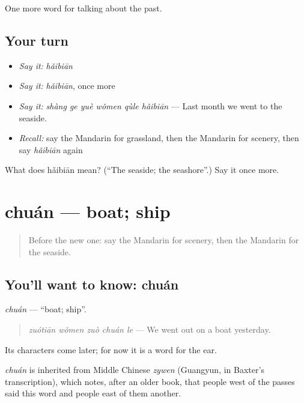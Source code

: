 \begin{grammarlens}[title={What you've built}]
One more word for talking about the past.
\end{grammarlens}

\subsection*{Your turn}
\begin{itemize}
\raggedright
  \item \emph{Say it:} \emph{hǎibiān}
  \item \emph{Say it:} \emph{hǎibiān}, once more
  \item \emph{Say it:} \emph{shàng ge yuè wǒmen qùle hǎibiān} — Last month we went to the seaside.
  \item \emph{Recall:} say the Mandarin for grassland, then the Mandarin for scenery, then say \emph{hǎibiān} again
\end{itemize}

\begin{tcolorbox}[breakable,colback=teal!4,colframe=teal!35!black,title={Before you move on}]
What does hǎibiān mean? (\textquotedblleft{}The seaside; the seashore\textquotedblright{}.) Say it once more.
\end{tcolorbox}
\section[chuán]{chuán — boat; ship}

\label{lesson:ZH-C227-chuan}



\begin{quote}
Before the new one: say the Mandarin for scenery, then the Mandarin for the seaside.
\end{quote}

\subsection*{You'll want to know: chuán}
\emph{chuán} — \textquotedblleft{}boat; ship\textquotedblright{}.

\begin{quote}
\emph{zuótiān wǒmen zuò chuán le} — We went out on a boat yesterday.
\end{quote}

Its characters come later; for now it is a word for the ear.

\begin{cousinweb}
\emph{chuán} is inherited from Middle Chinese \emph{zywen} (Guangyun, in Baxter's transcription), which notes, after an older book, that people west of the passes said this word and people east of them another.
\end{cousinweb}

